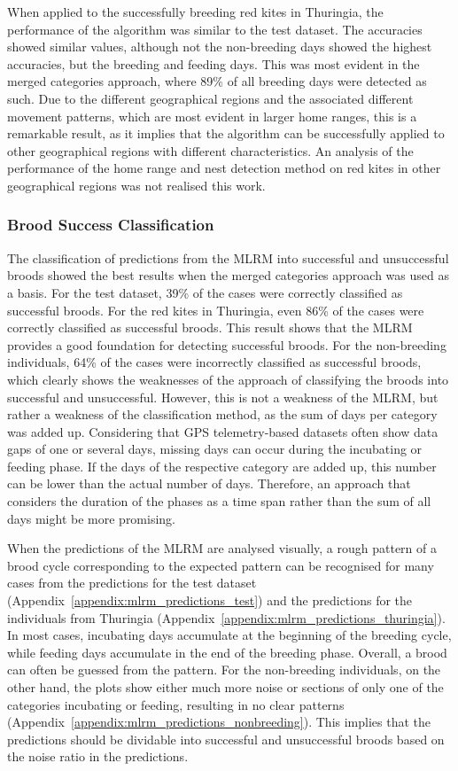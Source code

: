 When applied to the successfully breeding red kites in Thuringia, the performance of the algorithm was similar to the test dataset. The accuracies showed similar values, although not the non-breeding days showed the highest accuracies, but the breeding and feeding days. This was most evident in the merged categories approach, where 89\% of all breeding days were detected as such. Due to the different geographical regions and the associated different movement patterns, which are most evident in larger home ranges, this is a remarkable result, as it implies that the algorithm can be successfully applied to other geographical regions with different characteristics. An analysis of the performance of the home range and nest detection method on red kites in other geographical regions was not realised this work.

\subsubsection{Brood Success Classification}
The classification of predictions from the MLRM into successful and unsuccessful broods showed the best results when the merged categories approach was used as a basis. For the test dataset, 39\% of the cases were correctly classified as successful broods. For the red kites in Thuringia, even 86\% of the cases were correctly classified as successful broods. This result shows that the MLRM provides a good foundation for detecting successful broods. For the non-breeding individuals, 64\% of the cases were incorrectly classified as successful broods, which clearly shows the weaknesses of the approach of classifying the broods into successful and unsuccessful. However, this is not a weakness of the MLRM, but rather a weakness of the classification method, as the sum of days per category was added up. Considering that GPS telemetry-based datasets often show data gaps of one or several days, missing days can occur during the incubating or feeding phase. If the days of the respective category are added up, this number can be lower than the actual number of days. Therefore, an approach that considers the duration of the phases as a time span rather than the sum of all days might be more promising.

When the predictions of the MLRM are analysed visually, a rough pattern of a brood cycle corresponding to the expected pattern can be recognised for many cases from the predictions for the test dataset (Appendix~\ref{appendix:mlrm_predictions_test}) and the predictions for the individuals from Thuringia (Appendix~\ref{appendix:mlrm_predictions_thuringia}). In most cases, incubating days accumulate at the beginning of the breeding cycle, while feeding days accumulate in the end of the breeding phase. Overall, a brood can often be guessed from the pattern. For the non-breeding individuals, on the other hand, the plots show either much more noise or sections of only one of the categories incubating or feeding, resulting in no clear patterns (Appendix~\ref{appendix:mlrm_predictions_nonbreeding}). This implies that the predictions should be dividable into successful and unsuccessful broods based on the noise ratio in the predictions. 



